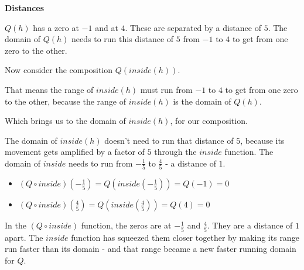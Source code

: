 \documentclass{ximera}
\begin{document}
\begin{observation} \textbf{\textcolor{-red!75}{Distances}}


$Q(h)$ has a zero at $-1$ and at $4$.  These are separated by a distance of $5$. The domain of $Q(h)$ needs to run this distance of $5$ from $-1$ to $4$ to get from one zero to the other.


Now consider the composition $Q(inside(h))$.

That means the range of $inside(h)$ must run from  $-1$ to $4$ to get from one zero to the other, because the range of $inside(h)$ is the domain of $Q(h)$.

Which brings us to the domain of $inside(h)$, for our composition. 

The domain of $inside(h)$ doesn't need to run that distance of $5$, because its movement gets amplified by a factor of $5$ through the $inside$ function.  The domain of $inside$ needs to run from $-\frac{1}{5}$ to $\frac{4}{5}$ - a distance of $1$.




\begin{itemize}
\item $(Q \circ inside)\left(-\frac{1}{5}\right) = Q\left(inside\left(-\frac{1}{5}\right)\right) = Q(-1) = 0$
\item $(Q \circ inside)\left(\frac{4}{5}\right) = Q\left(inside\left(\frac{4}{5}\right)\right) = Q(4) = 0$
\end{itemize}


In the $(Q \circ inside)$ function, the zeros are at $-\frac{1}{5}$ and $\frac{4}{5}$.  They are a distance of $1$ apart.  The $inside$ function has squeezed them closer together by making its range run faster than its domain - and that range became a new faster running domain for $Q$.




\end{observation}
\end{document}
